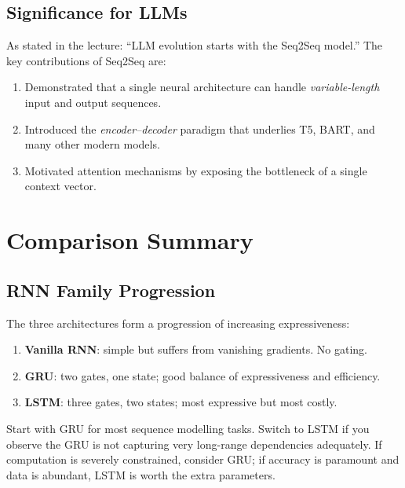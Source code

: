\documentclass[12pt,a4paper]{article}
\begin{document}
\subsection{Significance for LLMs}

As stated in the lecture: ``LLM evolution starts with the Seq2Seq model.'' The key contributions of
Seq2Seq are:
\begin{enumerate}[label=\arabic*.]
  \item Demonstrated that a single neural architecture can handle \emph{variable-length} input and
        output sequences.
  \item Introduced the \emph{encoder--decoder} paradigm that underlies T5, BART, and many
        other modern models.
  \item Motivated attention mechanisms by exposing the bottleneck of a single context vector.
\end{enumerate}

\section{Comparison Summary}
\label{sec:comparison}

\subsection{RNN Family Progression}

The three architectures form a progression of increasing expressiveness:
\begin{enumerate}
  \item \textbf{Vanilla RNN}: simple but suffers from vanishing gradients. No gating.
  \item \textbf{GRU}: two gates, one state; good balance of expressiveness and efficiency.
  \item \textbf{LSTM}: three gates, two states; most expressive but most costly.
\end{enumerate}

\begin{keyinsight}[title=Practical Rule of Thumb]
Start with GRU for most sequence modelling tasks. Switch to LSTM if you observe the GRU is not
capturing very long-range dependencies adequately. If computation is severely constrained, consider
GRU; if accuracy is paramount and data is abundant, LSTM is worth the extra parameters.
\end{keyinsight}
\end{document}
